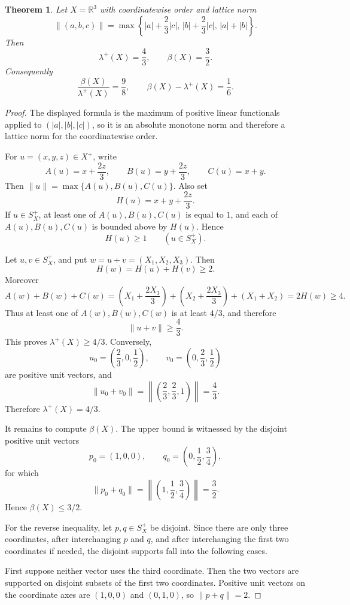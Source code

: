 \documentclass[11pt]{article}
\newtheorem{theorem}{Theorem}
\newcommand{\R}{\mathbb R}
\newcommand{\lamplus}{\lambda^+}
\begin{document}
\begin{theorem}
Let \(X=\R^3\) with coordinatewise order and lattice norm
\[
\|(a,b,c)\|
=\max\left\{
|a|+\frac{2}{3}|c|,\,
|b|+\frac{2}{3}|c|,\,
|a|+|b|
\right\}.
\]
Then
\[
\lamplus(X)=\frac43,\qquad \beta(X)=\frac32.
\]
Consequently
\[
\frac{\beta(X)}{\lamplus(X)}=\frac98,\qquad
\beta(X)-\lamplus(X)=\frac16.
\]
\end{theorem}

\begin{proof}
The displayed formula is the maximum of positive linear functionals applied to
\((|a|,|b|,|c|)\), so it is an absolute monotone norm and therefore a lattice
norm for the coordinatewise order.

For \(u=(x,y,z)\in X^+\), write
\[
A(u)=x+\frac{2z}{3},\qquad
B(u)=y+\frac{2z}{3},\qquad
C(u)=x+y.
\]
Then \(\|u\|=\max\{A(u),B(u),C(u)\}\).  Also set
\[
H(u)=x+y+\frac{2z}{3}.
\]
If \(u\in S_X^+\), at least one of \(A(u),B(u),C(u)\) is equal to \(1\), and
each of \(A(u),B(u),C(u)\) is bounded above by \(H(u)\).  Hence
\[
H(u)\ge 1\qquad (u\in S_X^+).
\]

Let \(u,v\in S_X^+\), and put \(w=u+v=(X_1,X_2,X_3)\).  Then
\[
H(w)=H(u)+H(v)\ge 2.
\]
Moreover
\[
A(w)+B(w)+C(w)
=\left(X_1+\frac{2X_3}{3}\right)
 +\left(X_2+\frac{2X_3}{3}\right)
 +(X_1+X_2)
=2H(w)\ge 4.
\]
Thus at least one of \(A(w),B(w),C(w)\) is at least \(4/3\), and therefore
\[
\|u+v\|\ge \frac43.
\]
This proves \(\lamplus(X)\ge 4/3\).  Conversely,
\[
u_0=\left(\frac23,0,\frac12\right),
\qquad
v_0=\left(0,\frac23,\frac12\right)
\]
are positive unit vectors, and
\[
\|u_0+v_0\|
=\left\|\left(\frac23,\frac23,1\right)\right\|
=\frac43.
\]
Therefore \(\lamplus(X)=4/3\).

It remains to compute \(\beta(X)\).  The upper bound is witnessed by the
disjoint positive unit vectors
\[
p_0=(1,0,0),\qquad q_0=\left(0,\frac12,\frac34\right),
\]
for which
\[
\|p_0+q_0\|
=\left\|\left(1,\frac12,\frac34\right)\right\|
=\frac32.
\]
Hence \(\beta(X)\le 3/2\).

For the reverse inequality, let \(p,q\in S_X^+\) be disjoint.  Since there are
only three coordinates, after interchanging \(p\) and \(q\), and after
interchanging the first two coordinates if needed, the disjoint supports fall
into the following cases.

First suppose neither vector uses the third coordinate.  Then the two vectors
are supported on disjoint subsets of the first two coordinates.  Positive unit
vectors on the coordinate axes are \((1,0,0)\) and \((0,1,0)\), so
\(\|p+q\|=2\).


\end{proof}
\end{document}
